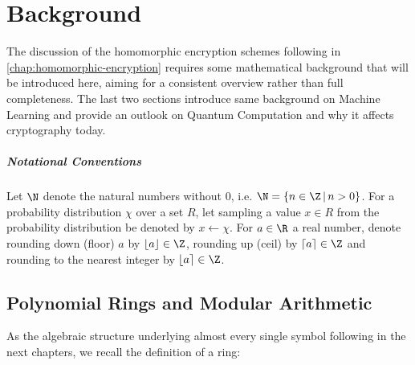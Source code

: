 \chapter{Background}
\label{chap:background}

The discussion of the homomorphic encryption schemes following in \autoref{chap:homomorphic-encryption} requires some mathematical background that will be introduced here, aiming for a consistent overview rather than full completeness.
The last two sections introduce same background on Machine Learning and provide an outlook on Quantum Computation and why it affects cryptography today.

\paragraph{Notational Conventions}
Let $\N$ denote the natural numbers without $0$, i.e. $\N = \{n \in \Z \,|\, n > 0\}$.
For a probability distribution $\chi$ over a set $R$, let sampling a value $x \in R$ from the probability distribution be denoted by $x \leftarrow \chi$.
For $a \in \R$ a real number, denote rounding down (floor) $a$ by $\lfloor a \rfloor \in \Z$,
rounding up (ceil) by $\lceil a \rceil \in \Z$ and rounding to the nearest integer by
$\lfloor a \rceil \in \Z$.

\section{Polynomial Rings and Modular Arithmetic}
As the algebraic structure underlying almost every single symbol following in the next chapters, we recall the definition of a ring:

